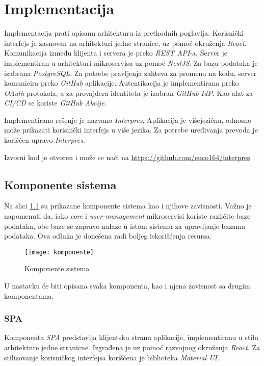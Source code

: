 \chapter{Implementacija}\label{ch:impl}

Implementacija prati opisanu arhitekturu iz prethodnih poglavlja. 
Korisnički interfejs je zasnovan na arhitekturi jedne stranice, 
uz pomoć okruženja \textit{React}. Komunikacija između klijenta i servera 
je preko \textit{REST API}-a. Server je implementiran u arhitekturi
mikroservisa uz pomoć \textit{NestJS}. Za bazu podataka 
je izabrana \textit{PostgreSQL}. Za potrebe pravljenja zahteva za promenu 
na kodu, server komunicira preko \textit{GitHub} aplikacije. Autentikacija 
je implementirana preko \textit{OAuth} protokola, a za provajdera 
identiteta je izabran \textit{GitHub IdP}. Kao alat za \textit{CI/CD} se koriste 
\textit{GitHub Akcije}. 

Implementirano rešenje je nazvano \textit{Interpres}. Aplikacija je 
višejezična, odnosno može prikazati korisnički interfejs u više 
jezika. Za potrebe uređivanja prevoda je korišćen upravo \textit{Interpres}.

Izvorni kod je otvoren i može se naći na \url{https://github.com/enco164/interpres}.


\section{Komponente sistema}

Na slici \ref{fig:komponente} su prikazane komponente sistema kao i
njihove zavisnosti. Važno je napomenuti da, iako \textit{core} i 
\textit{user-management} mikroservisi koriste različite baze podataka,
obe baze se zapravo nalaze u istom sistemu za upravljanje bazama podataka. 
Ova odluka je donešena radi boljeg iskorišćenja resursa. 

\begin{figure}[h]
  \centering
  \texttt{[image: komponente]}
  \caption{Komponente sistema}
  \label{fig:komponente}
\end{figure}

U nastavku će biti opisana svaka komponenta, kao i njena 
zavisnost sa drugim komponentama.

\subsection{SPA}
Komponenta \textit{SPA} predstavlja klijentsku stranu aplikacije, implementiranu 
u stilu arhitekture jedne stranicne. Izgrađena je 
uz pomoć razvojnog okruženja \textit{React}. Za stilizovanje korisničkog 
interfejsa korišćena je biblioteka \textit{Material UI}. 


